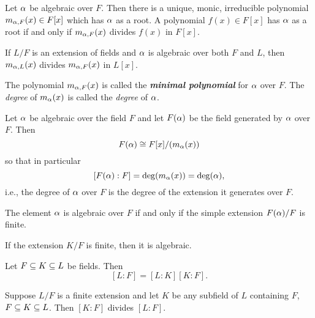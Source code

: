 \nl

\begin{prop}
Let $\alpha$ be algebraic over $F$. Then there is a unique, monic, irreducible polynomial $m_{\alpha,F}(x)\in F[x]$ which has $\alpha$ as a root. A polynomial $f(x)\in F[x]$ has $\alpha$ as a root if and only if $m_{\alpha, F}(x)$ divides $f(x)$ in $F[x]$. 
\end{prop}

\nl

\begin{cor}
If $L/F$ is an extension of fields and $\alpha$ is algebraic over both $F$ and $L$, then $m_{\alpha,L}(x)$ divides $m_{\alpha,F}(x)$ in $L[x]$.
\end{cor}

\nl

\begin{defn}
The polynomial $m_{\alpha, F}(x)$ is called the \textit{\textbf{minimal polynomial}} for $\alpha$ over $F$. The \textit{degree} of $m_\alpha(x)$ is called the \textit{degree} of $\alpha$.
\end{defn}

\nl

\begin{prop}
Let $\alpha$ be algebraic over the field $F$ and let $F(\alpha)$ be the field generated by $\alpha$ over $F$. Then
\[F(\alpha) \cong F[x]/(m_\alpha(x))\]
so that in particular
\[[F(\alpha):F] = \deg(m_\alpha(x)) = \deg(\alpha),\]
i.e., the degree of $\alpha$ over $F$ is the degree of the extension it generates over $F$.
\end{prop}

\nl

\begin{prop}
The element $\alpha$ is algebraic over $F$ if and only if the simple extension $F(\alpha)/F$ is finite.
\end{prop}

\nl

\begin{cor}
If the extension $K/F$ is finite, then it is algebraic.
\end{cor}

\nl

\begin{thm}
Let $F\subseteq K\subseteq L$ be fields. Then 
\[[L:F] = [L:K][K:F].\]
\end{thm}

\nl

\begin{cor}
Suppose $L/F$ is a finite extension and let $K$ be any subfield of $L$ containing $F$, $F\subseteq K\subseteq L$. Then $[K:F]$ divides $[L:F]$.
\end{cor}

